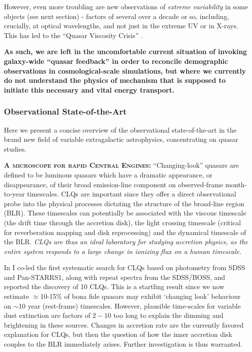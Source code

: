 \smallskip 
\smallskip
\noindent
However, even more troubling are new observations of {\it extreme
variability} in some objects (see next section) - factors of several
over a decade or so, including, crucially, at optical wavelengths, and
not just in the extreme UV or in X-rays. This has led to the ``Quasar
Viscosity Crisis'' \citep{Lawrence2018}.

\smallskip 
\smallskip
\noindent
{\bf As such, we are left in the uncomfortable current situation of invoking
galaxy-wide ``quasar feedback'' in order to reconcile demographic
observations in cosmological-scale simulations, but where we currently
do not understand the physics of mechanism that is supposed to
initiate this necessary and vital energy transport.}


\subsubsection{Observational State-of-the-Art}
Here we present a concise overview of the observational
state-of-the-art in the brand new field of variable extragalactic
astrophysics, concentrating on quasar studies.

\smallskip
\smallskip
\noindent
\textbf{\textsc{A microscope for rapid Central Engines:}}
``Changing-look'' quasars \citep[CLQs; ][]{LaMassa2015,
Runnoe2016, Ruan2016, Runco2016, MacLeod2016, Yang2017} 
are defined to be luminous quasars which have a
dramatic appearance, or disappearance, of their broad emission-line
component on observed-frame month-to-year timescales.  CLQs are
important since they offer a direct observational probe into the
physical processes dictating the structure of the broad-line region
(BLR). These timescales can potentially be associated with the viscous
timescale (the drift time through the accretion disk), the light
crossing timescale (critical for reverberation mapping and disk
reprocessing) and the dynamical timescale of the BLR.  {\it CLQs are thus
an ideal laboratory for studying accretion physics, as the entire
system responds to a large change in ionizing flux on a human
timescale.}

\smallskip 
\smallskip
\noindent 
In \citet{MacLeod2016} I co-led the first systematic search for CLQs
based on photometry from SDSS and Pan-STARRS1, along with repeat
spectra from the SDSS/BOSS, and reported the discovery of 10
CLQs. This is a startling result since we now estimate
$\approx$10-15\% of bona fide quasars may exhibit `changing look'
behaviour on $\sim$10 year (rest-frame) timescales. However, plausible
time-scales for variable dust extinction are factors of $2-10$ too
long to explain the dimming and brightening in these sources.  Changes
in accretion rate are the currently favored explanation for CLQs, but
then the question of how the inner accretion disk couples to the BLR
immediately arises. Further investigation is thus warranted.

